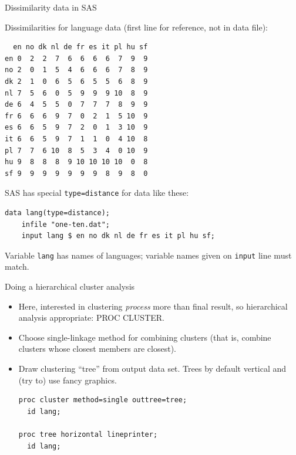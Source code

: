 \documentclass[pdf]{prosper}
\begin{document}
\begin{slide}{Dissimilarity data in SAS}

Dissimilarities for language data (first line for reference, not in data file):

{\scriptsize
\begin{verbatim}
  en no dk nl de fr es it pl hu sf
en 0  2  2  7  6  6  6  6  7  9  9
no 2  0  1  5  4  6  6  6  7  8  9
dk 2  1  0  6  5  6  5  5  6  8  9
nl 7  5  6  0  5  9  9  9 10  8  9
de 6  4  5  5  0  7  7  7  8  9  9
fr 6  6  6  9  7  0  2  1  5 10  9
es 6  6  5  9  7  2  0  1  3 10  9
it 6  6  5  9  7  1  1  0  4 10  8
pl 7  7  6 10  8  5  3  4  0 10  9
hu 9  8  8  8  9 10 10 10 10  0  8
sf 9  9  9  9  9  9  9  8  9  8  0
\end{verbatim}
}

SAS has special \verb-type=distance- for data like these:

\begin{verbatim}
data lang(type=distance);
	infile "one-ten.dat";
	input lang $ en no dk nl de fr es it pl hu sf;
\end{verbatim}

Variable \verb-lang- has names of languages; variable names given on \verb-input- line must match.

  
\end{slide}

\begin{slide}{Doing a hierarchical cluster analysis}

  \begin{itemize}
  \item Here, interested in clustering {\em process} more than final result, so hierarchical analysis appropriate: PROC CLUSTER.
  \item Choose single-linkage method for combining clusters (that is, combine clusters whose closest members are closest).
  \item Draw clustering ``tree'' from output data set. Trees by default vertical and (try to) use fancy graphics.

\begin{verbatim}
proc cluster method=single outtree=tree;
  id lang;

proc tree horizontal lineprinter;
  id lang;

\end{verbatim}
  \end{itemize}
  
\end{slide}
\end{document}
